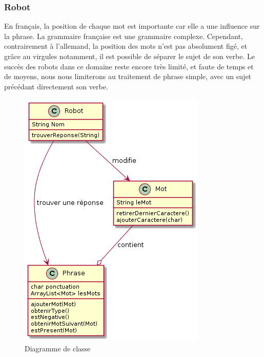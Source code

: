 \subsubsection{Robot}
En français, la position de chaque mot est importante car elle a une influence sur la phrase. La grammaire française est une grammaire complexe. Cependant, contrairement à l'allemand, la position des mots n'est pas absolument figé, et grâce au virgules notamment, il est possible de séparer le sujet de son verbe. Le succès des robots dans ce domaine reste encore très limité, et faute de temps et de moyens, nous nous limiterons au traitement de phrase simple, avec un sujet précédant directement son verbe.

\begin{figure}
    \center
	\includegraphics[scale=0.5]{diagrammeDeClasse.png}
	\caption{Diagramme de classe}
\end{figure}

